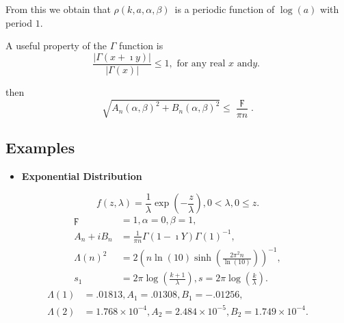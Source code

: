 \documentclass[titlepage,fleqn]{article}%
\begin{document}
From this we obtain that $\rho(k,a,\alpha,\beta)$\ is a periodic function of
$\log\left(  a\right)  $ with period $1$.

A useful property of the $\Gamma$ function is%
\begin{equation}
\frac{\left\vert \Gamma\left(  x+\imath y\right)  \right\vert }{\left\vert
\Gamma\left(  x\right)  \right\vert }\leq1,\text{ for any real }x\text{ and
}y\text{. } \label{Gamma1}%
\end{equation}


\noindent then%
\begin{equation}
\sqrt{A_{n}(\alpha,\beta)^{2}+B_{n}(\alpha,\beta)^{2}}\leq\frac{\digamma}{\pi
n}. \label{AB1}%
\end{equation}


\subsection{Examples}

\begin{itemize}
\item \textbf{Exponential Distribution}
\end{itemize}

%

\[
f(z,\lambda)=\frac{1}{\lambda}\exp\left(  -\frac{z}{\lambda}\right)
,0<\lambda,0\leq z.
\]%
\begin{align*}
\digamma &  =1,\alpha=0,\beta=1,\\
A_{n}+iB_{n}  &  =\frac{1}{\pi n}\Gamma\left(  1-\imath Y\right)
\Gamma\left(  1\right)  ^{-1},\\
\Lambda(n)^{2}  &  =2\left(  n\ln(10)\sinh\left(  \frac{2\pi^{2}n}{\ln
(10)}\right)  \right)  ^{-1},\\
s_{1}  &  =2\pi\log\left(  \frac{k+1}{\lambda}\right)  ,s=2\pi\log\left(
\frac{k}{\lambda}\right)  .
\end{align*}%
\begin{align*}
\Lambda(1)  &  =.01813,A_{1}=.01308,B_{1}=-.01256,\\
\Lambda(2)  &  =1.768\times10^{-4},A_{2}=2.484\times10^{-5},B_{2}%
=1.749\times10^{-4}.
\end{align*}
\end{document}
